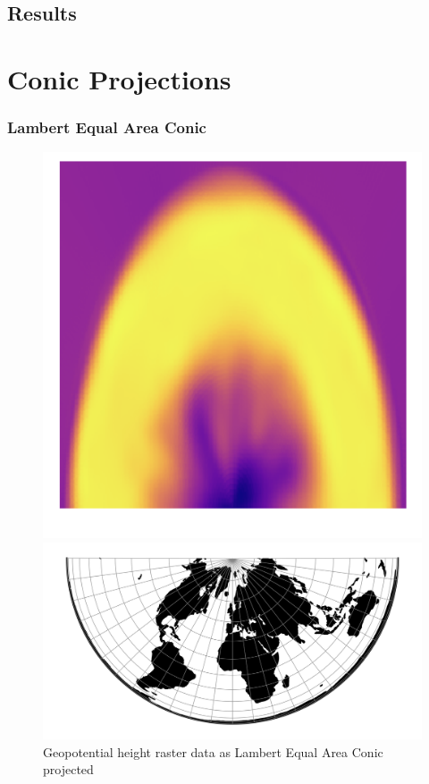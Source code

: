 \subsection{Results}

\newpage
\section{Conic Projections}
\subsubsection*{Lambert Equal Area Conic}
\begin{figure}[h]
    \centering
    \begin{minipage}{0.30\textwidth}
        \centering
        \includegraphics[width=0.9\linewidth]{figures/chapter-8/geopoth_leac.png}
        \caption{ Geopotential height raster data as Lambert Equal Area Conic projected}
        \label{fig:leac_geopoth_raster}
    \end{minipage}\hfill
    \begin{minipage}{0.30\textwidth}
        \centering
        \includegraphics[width=0.9\linewidth]{figures/chapter-8/leac.png}

\end{minipage}
\end{figure}
